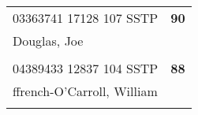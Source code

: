 \documentclass[a4paper,12pt]{article}
\begin{document}
\begin{tabular}{
   |p{9mm}|
    p{9mm}|
    p{9mm}|
    p{9mm}|
    p{9mm}|
    p{9mm}|
    p{9mm}|
    p{9mm}|
    p{9mm}|
    p{9mm}|}
      &    &    &    &    &    &    &    &    &     \\
\hline\hline
\multicolumn{9}{|l|}{03363741 17128 107 SSTP} & \textbf{90} \\
\hline
\multicolumn{10}{|l|}{Douglas, Joe} \\
\hline
   \vrule height8mm width0pt depth2mm 
      &    &    &    &    &    &    &    &    &     \\
\hline\hline
\multicolumn{9}{|l|}{04389433 12837 104 SSTP} & \textbf{88} \\
\hline
\multicolumn{10}{|l|}{ffrench-O'Carroll, William} \\
\hline
   \vrule height8mm width0pt depth2mm 
      &    &    &    &    &    &    &    &    &     \\
\hline\hline
\end{tabular}
\newpage
\end{document}
